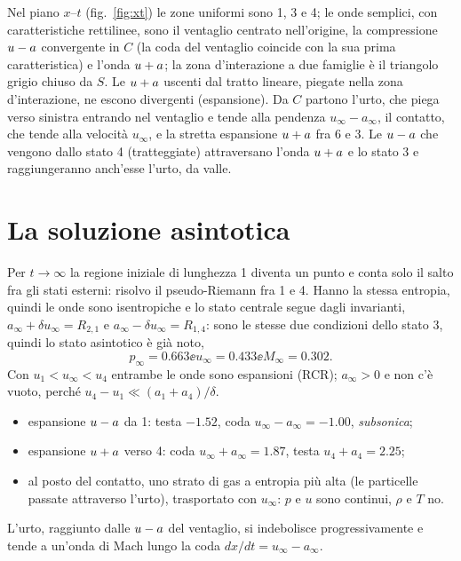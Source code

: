
Nel piano $x$--$t$ (fig.~\ref{fig:xt}) le zone uniformi sono 1, 3 e 4; le onde semplici, con caratteristiche
rettilinee, sono il ventaglio centrato nell'origine, la compressione $u-a$ convergente in $C$ (la coda del
ventaglio coincide con la sua prima caratteristica) e l'onda $u+a$; la zona d'interazione a due famiglie è il
triangolo grigio chiuso da $S$. Le $u+a$ uscenti dal tratto lineare, piegate nella zona d'interazione, ne escono
divergenti (espansione). Da $C$ partono l'urto, che piega verso sinistra entrando nel ventaglio e tende alla
pendenza $u_\infty-a_\infty$, il contatto, che tende alla velocità $u_\infty$, e la stretta espansione $u+a$ fra 6
e 3. Le $u-a$ che vengono dallo stato 4 (tratteggiate) attraversano l'onda $u+a$ e lo stato 3 e raggiungeranno
anch'esse l'urto, da valle.

\section*{La soluzione asintotica}
Per $t\to\infty$ la regione iniziale di lunghezza 1 diventa un punto e conta solo il salto fra gli stati esterni:
risolvo il pseudo-Riemann fra 1 e 4. Hanno la stessa entropia, quindi le onde sono isentropiche e lo stato
centrale segue dagli invarianti, $a_\infty+\delta u_\infty=R_{2,1}$ e $a_\infty-\delta u_\infty=R_{1,4}$: sono le
stesse due condizioni dello stato 3, quindi lo stato asintotico è già noto,
\[
p_\infty=\num{0.663}\ee u_\infty=\num{0.433}\ee M_\infty=\num{0.302}.
\]
Con $u_1<u_\infty<u_4$ entrambe le onde sono espansioni (RCR); $a_\infty>0$ e non c'è vuoto, perché
$u_4-u_1\ll(a_1+a_4)/\delta$.
\begin{itemize}
\item espansione $u-a$ da 1: testa $-\num{1.52}$, coda $u_\infty-a_\infty=-\num{1.00}$, \emph{subsonica};
\item espansione $u+a$ verso 4: coda $u_\infty+a_\infty=\num{1.87}$, testa $u_4+a_4=\num{2.25}$;
\item al posto del contatto, uno strato di gas a entropia più alta (le particelle passate attraverso l'urto),
  trasportato con $u_\infty$: $p$ e $u$ sono continui, $\rho$ e $T$ no.
\end{itemize}
L'urto, raggiunto dalle $u-a$ del ventaglio, si indebolisce progressivamente e tende a un'onda di Mach lungo la
coda $dx/dt=u_\infty-a_\infty$.

